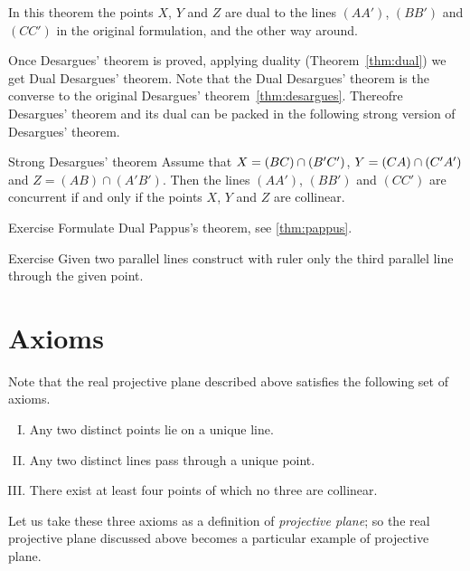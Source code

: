 In this theorem the points $X$, $Y$ and $Z$ 
are dual to the lines $(AA')$, $(BB')$ and $(CC')$ in the original formulation, and the other way around.

Once Desargues' theorem is proved, applying duality (Theorem~\ref{thm:dual})
we get Dual Desargues' theorem.
Note that the  Dual Desargues' theorem is the converse to the original Desargues' theorem~\ref{thm:desargues}.
Thereofre Desargues' theorem and its dual can be packed in the
following strong version of Desargues' theorem.

\begin{thm}{Strong Desargues' theorem}
Assume that $X\z=(BC)\z\cap (B'C')$, $Y\z=(CA)\cap (C'A')$ and $Z=(AB)\cap (A'B')$.
Then the lines  $(AA')$, $(BB')$ and $(CC')$ are concurrent if and only if the  points $X$, $Y$ and $Z$ are collinear.
\end{thm}


\begin{thm}{Exercise}\label{ex:dual-pappus}
Formulate Dual Pappus's theorem, see \ref{thm:pappus}.
\end{thm}

\begin{thm}{Exercise}\label{ex:dual-desargues-construction}
Given two parallel lines construct with ruler only the third parallel line through the given point.
\end{thm}

\section*{Axioms}

Note that the real projective plane described above satisfies the following set of axioms.

\begin{enumerate}[I.]
\item\label{def:proj-axioms:1} Any two distinct points lie on a unique line.
\item\label{def:proj-axioms:2} Any two distinct lines pass through a unique point.
\item\label{def:proj-axioms:3} There exist at least four points of which no three are collinear.
\end{enumerate}

Let us take these three axioms as a definition of \emph{projective plane};
so the real projective plane discussed above becomes a particular example of projective plane.

